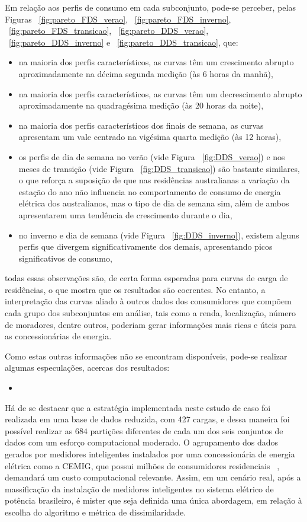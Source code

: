 Em relação aos perfis de consumo em cada subconjunto, pode-se perceber, pelas Figuras  ~\ref{fig:pareto_FDS_verao}, ~\ref{fig:pareto_FDS_inverno}, ~\ref{fig:pareto_FDS_transicao}, ~\ref{fig:pareto_DDS_verao}, ~\ref{fig:pareto_DDS_inverno} e ~\ref{fig:pareto_DDS_transicao}, que:
\begin{itemize}
	\item na maioria dos perfis característicos, as curvas têm um crescimento abrupto aproximadamente na décima segunda medição (às 6 horas da manhã),
	\item na maioria dos perfis característicos, as curvas têm um decrescimento abrupto aproximadamente na quadragésima medição (às 20 horas da noite),
	\item na maioria dos perfis característicos dos finais de semana, as curvas apresentam um vale centrado na vigésima quarta medição (às 12 horas),
	\item os perfis de dia de semana no verão (vide Figura ~\ref{fig:DDS_verao}) e nos meses de transição (vide Figura ~\ref{fig:DDS_transicao}) são bastante similares, o que reforça a suposição de que nas residências australianas a variação da estação do ano não influencia no comportamento de consumo de energia elétrica dos australianos, mas o tipo de dia de semana sim, além de ambos apresentarem uma tendência de crescimento durante o dia,
	\item no inverno e dia de semana (vide Figura ~\ref{fig:DDS_inverno}), existem alguns perfis que divergem significativamente dos demais, apresentando picos significativos de consumo,
\end{itemize}
todas essas observações são, de certa forma esperadas para curvas de carga de residências, o que mostra que os resultados são coerentes. No entanto, a interpretação das curvas aliado à outros dados dos consumidores que compõem cada grupo dos subconjuntos em análise, tais como a renda, localização, número de moradores, dentre outros, poderiam gerar informações mais ricas e úteis para as concessionárias de energia.

Como estas outras informações não se encontram disponíveis, pode-se realizar algumas especulações, acercas dos resultados:
\begin{itemize}
	\item 
\end{itemize}

Há de se destacar que a estratégia implementada neste estudo de caso foi realizada em uma base de dados reduzida, com 427 cargas, e dessa maneira foi possível realizar as $684$ partições diferentes de cada um dos seis conjuntos de dados com um esforço computacional moderado. O agrupamento dos dados gerados por medidores inteligentes instalados por uma concessionária de energia elétrica como a CEMIG, que possui milhões de consumidores residenciais ~\parencite{DadosCemig}, demandará um custo computacional relevante. Assim, em um cenário real, após a massificação da instalação de medidores inteligentes no sistema elétrico de potência brasileiro, é mister que seja definida uma única abordagem, em relação à escolha do algoritmo e métrica de dissimilaridade.


